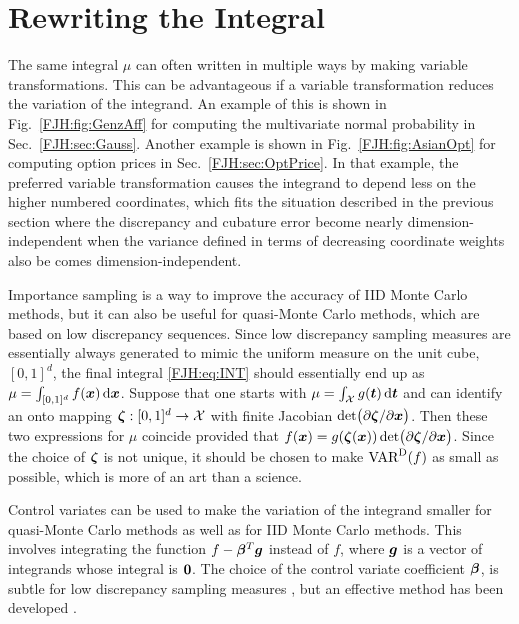 \documentclass[graybox,footinfo]{svmult}
\begin{document}
\begin{FJHLesson}
	\FJHLessonEight
\end{FJHLesson}

\section{Rewriting the Integral}

The same integral $\mu$ can often written in multiple ways by making variable 
transformations.  This can be advantageous if a variable transformation reduces the 
variation of the integrand.  An example of this is shown in Fig.\ \ref{FJH:fig:GenzAff} for 
computing the multivariate normal probability in Sec.\ \ref{FJH:sec:Gauss}.  Another 
example is shown in Fig.\ \ref{FJH:fig:AsianOpt} for computing option prices  in Sec.\ 
\ref{FJH:sec:OptPrice}.  In that example, the preferred variable transformation causes 
the integrand to depend less on the higher numbered coordinates, which fits the situation 
described in the previous section where the discrepancy and cubature error become 
nearly dimension-independent when the variance defined in terms of decreasing 
coordinate weights also be comes dimension-independent.

Importance sampling is a way to improve the accuracy of IID Monte Carlo 
methods, but it can also be useful for quasi-Monte Carlo methods, which are based on 
low discrepancy sequences.  Since low discrepancy sampling measures are essentially 
always generated to mimic the uniform measure on the unit cube, $[0,1]^d$, the final 
integral \eqref{FJH:eq:INT} should essentially end up as $\mu = \int_{[0,1]^{d}} f({\boldsymbol{x}}) \, 
\mathrm{d}{\boldsymbol{x}}$.  Suppose that one starts with $\mu = \int_{{\mathcal{X}}} g({\boldsymbol{t}}) \, 
\mathrm{d}{\boldsymbol{t}}$ and can identify an onto mapping ${\boldsymbol{\zeta}}: [0,1]^d \to {\mathcal{X}}$ with finite
Jacobian $\det\bigl( \partial {\boldsymbol{\zeta}}/\partial {\boldsymbol{x}}\bigr)$.  Then these two expressions for 
$\mu$ coincide provided that $f({\boldsymbol{x}}) = g({\boldsymbol{\zeta}}({\boldsymbol{x}})) \det\bigl( \partial 
{\boldsymbol{\zeta}}/\partial {\boldsymbol{x}}\bigr)$.  Since the choice of ${\boldsymbol{\zeta}}$ is not unique, it should be 
chosen to make $\textup{VAR}^{\textup{D}}(f)$ as small as possible, which is more of an art than a 
science.

Control variates can be used to make the variation of the integrand smaller for 
quasi-Monte Carlo methods as well as for IID Monte Carlo methods.  This involves 
integrating the function $f - {\boldsymbol{\beta}}^T {\boldsymbol{g}}$ instead of $f$, where ${\boldsymbol{g}}$ is a vector of 
integrands whose integral is ${\boldsymbol{0}}$.  The choice of the 
control variate coefficient ${\boldsymbol{\beta}}$, is subtle for low discrepancy sampling measures 
\cite{HicEtal03}, but an effective method has been 
developed \cite{HicEtal17a}.
\end{document}
